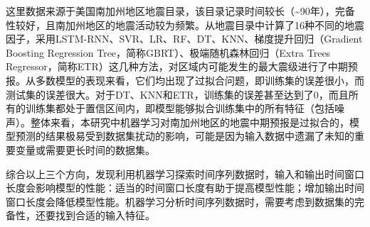 \begin{enumerate}
  这里数据来源于美国南加州地区地震目录，该目录记录时间较长（\sim 90年），完备性较好，且南加州地区的地震活动较为频繁。从地震目录中计算了16种不同的地震因子，采用LSTM-RNN、SVR、LR、RF、DT、KNN、梯度提升回归（Gradient Boosting Regression Tree，简称GBRT）、极端随机森林回归（Extra Trees Regressor，简称ETR）这几种方法，对区域内可能发生的最大震级进行了中期预报。从多数模型的表现来看，它们均出现了过拟合问题，即训练集的误差很小，而测试集的误差很大。对于DT、KNN和ETR，训练集的误差甚至达到了0，而且所有的训练集都处于置信区间内，即模型能够拟合训练集中的所有特征（包括噪声）。整体来看，本研究中机器学习对南加州地区的地震中期预报是过拟合的，模型预测的结果极易受到数据集扰动的影响，可能是因为输入数据中遗漏了未知的重要变量或需要更长时间的数据集。

  综合以上三个方向，发现利用机器学习探索时间序列数据时，输入和输出时间窗口长度会影响模型的性能：适当的时间窗口长度有助于提高模型性能；增加输出时间窗口长度会降低模型性能。机器学习分析时间序列数据时，需要考虑到数据集的完备性，还要找到合适的输入特征。

\end{enumerate}


